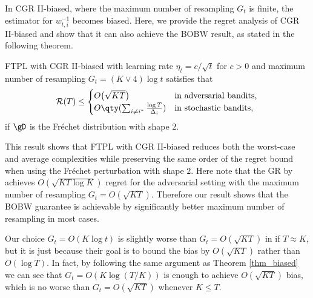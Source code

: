 In CGR II-biased, where the maximum number of resampling $G_{t}$ is finite, the estimator for $w_{t,i}^{-1}$ becomes biased.
Here, we provide the regret analysis of CGR II-biased and show that it can also achieve the BOBW result,
as stated in the following theorem.
\begin{theorem}\label{thm_biased}
    FTPL with CGR II-biased with learning rate $\eta_t = c/\sqrt{t}$ for $c>0$ and maximum number of resampling $G_{t}=(K\lor 4)\log t$ satisfies that
    \begin{equation*}
        \mathcal{R}(T) \leq \begin{cases}
            O\big(\sqrt{KT}\big)  &\text{in adversarial bandits,} \\
            O\qty(\sum_{i \ne i^*}\frac{\log T}{\Delta_i})& \text{in stochastic bandits,}
        \end{cases}
    \end{equation*}
    if
$\gD$ is the Fr\'{e}chet distribution with shape $2$.
\end{theorem}
This result shows that FTPL with CGR II-biased reduces both the worst-case and average complexities while preserving the same order of the regret bound when using the Fr\'{e}chet perturbation with shape $2$.
Here note that the GR by \citet{JMLR:v17:15-091} achieves $O(\sqrt{KT\log K})$ regret for the adversarial setting
with the maximum number of resampling $G_t=O(\sqrt{KT})$.
Therefore our result shows that the BOBW guarantee is achievable by significantly better
maximum number of resampling in most cases.

\begin{remark}{\rm%
Our choice $G_t=O(K\log t)$ is slightly worse than $G_t=O(\sqrt{KT})$ in \citet{JMLR:v17:15-091}
if $T \approx K$,
but it is just because their goal is to bound the bias by $O(\sqrt{KT})$ rather than $O(\log T)$.
In fact, by following the same argument as Theorem \ref{thm_biased} we can see that
$G_t=O(K\log (T/K))$ is enough to achieve $O(\sqrt{KT})$ bias, which is no worse than $G_t=O(\sqrt{KT})$ whenever $K\le T$.
}\end{remark}





